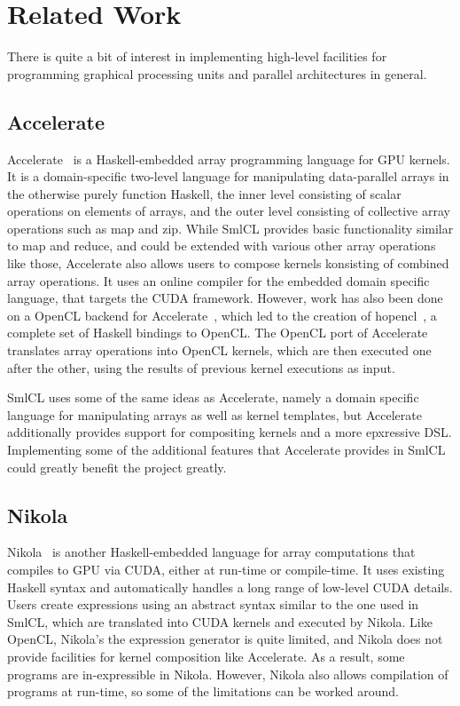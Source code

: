\section{Related Work}

There is quite a bit of interest in implementing high-level facilities
for programming graphical processing units and parallel architectures
in general.

\subsection{Accelerate}

Accelerate~\cite{lee2009gpu} is a Haskell-embedded array programming
language for GPU kernels. It is a domain-specific two-level language
for manipulating data-parallel arrays in the otherwise purely function
Haskell, the inner level consisting of scalar operations on elements
of arrays, and the outer level consisting of collective array
operations such as map and zip. While SmlCL provides basic
functionality similar to map and reduce, and could be extended with
various other array operations like those, Accelerate also allows
users to compose kernels konsisting of combined array operations.  It
uses an online compiler for the embedded domain specific language,
that targets the CUDA framework. However, work has also been done on a
OpenCL backend for Accelerate~\cite{dybdal2011acc}, which led to the
creation of hopencl~\cite{hopencl}, a complete set of Haskell bindings
to OpenCL. The OpenCL port of Accelerate translates array operations
into OpenCL kernels, which are then executed one after the other,
using the results of previous kernel executions as input.

SmlCL uses some of the same ideas as Accelerate, namely a domain
specific language for manipulating arrays as well as kernel templates,
but Accelerate additionally provides support for compositing kernels
and a more epxressive DSL. Implementing some of the additional
features that Accelerate provides in SmlCL could greatly benefit the
project greatly.

\subsection{Nikola}

Nikola~\cite{mainland2010nikola} is another Haskell-embedded language
for array computations that compiles to GPU via CUDA, either at
run-time or compile-time. It uses existing Haskell syntax and
automatically handles a long range of low-level CUDA details. Users
create expressions using an abstract syntax similar to the one used in
SmlCL, which are translated into CUDA kernels and executed by
Nikola. Like OpenCL, Nikola's the expression generator is quite
limited, and Nikola does not provide facilities for kernel composition
like Accelerate. As a result, some programs are in-expressible in
Nikola. However, Nikola also allows compilation of programs at
run-time, so some of the limitations can be worked around.

